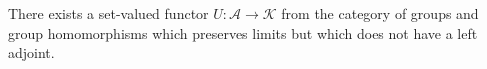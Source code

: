 There exists a set-valued functor $U: \mathcal{A} \longrightarrow \mathcal{K}$ from the category of groups and group homomorphisms which preserves limits but which does not have a left adjoint.
